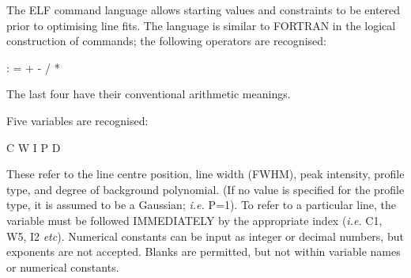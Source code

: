 \documentclass[twoside,11pt,noabs,nolof]{starlink}
\begin{document}
The ELF command language allows starting values and constraints to be
entered prior to optimising line fits. The language is similar to
FORTRAN in the logical construction of commands; the following
operators are recognised:

\begin{terminalv}
: = + - / *
\end{terminalv}

The last four have their conventional arithmetic meanings.

Five variables are recognised:

\begin{terminalv}
C W I P D
\end{terminalv}

These refer to the line centre position, line width (FWHM), peak
intensity, profile type, and degree of background polynomial. (If no
value is specified for the profile type, it is assumed to be a
Gaussian; \emph{i.e.} P=1). To refer to a particular line, the variable
must be followed IMMEDIATELY by the appropriate index (\emph{i.e.} C1,
W5, I2 \emph{etc}). Numerical constants can be input as integer or decimal
numbers, but exponents are not accepted. Blanks are permitted, but not
within variable names or numerical constants.
\end{document}
